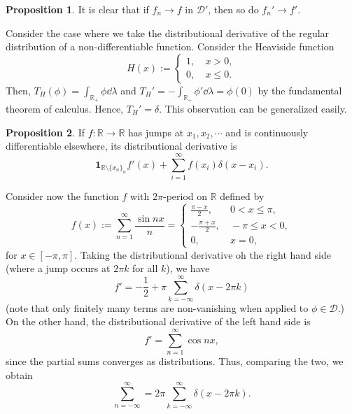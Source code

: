 \documentclass[]{article}
\theoremstyle{definition}
\theoremstyle{definition}
\newtheorem{proposition}{Proposition}[section]
\begin{document}
\begin{proposition}
  It is clear that if \(f_n \to f\) in \(\mathcal{D}'\), then so do \(f_n' \to f'\).
\end{proposition}

Consider the case where we take the distributional derivative of the regular 
distribution of a non-differentiable function. Consider the Heaviside function 
\[H(x) := \begin{cases}
  1, & \ x > 0,\\
  0, & \ x \le 0.
\end{cases}\]
Then, \(T_H(\phi) = \int_{\mathbb{R}_+} \phi \dd \lambda\) and 
\(T_H' = -  \int_{\mathbb{R}_+} \phi' \dd \lambda = \phi(0)\) by the fundamental 
theorem of calculus. Hence, \(T_H' = \delta\). This observation can be generalized 
easily. 

\begin{proposition}
  If \(f : \mathbb{R} \to \mathbb{R}\) has jumps at \(x_1, x_2, \cdots\) and 
  is continuously differentiable elsewhere, its distributional derivative is 
  \[\mathbf{1}_{\mathbb{R} \setminus \{x_n\}_n}
    f'(x) + \sum_{i = 1}^\infty f(x_i)\delta(x - x_i).\]
\end{proposition}

Consider now the function \(f\) with \(2\pi\)-period on \(\mathbb{R}\) defined by 
\[f(x) := \sum_{n = 1}^\infty \frac{\sin nx}{n} = 
  \begin{cases}
    \frac{\pi - x}{2}, & \ 0 < x \le \pi,\\
    -\frac{\pi + x}{2}, & \ -\pi \le x < 0,\\
    0, & \ x = 0,
  \end{cases}\]
for \(x \in [-\pi, \pi]\). Taking the distributional derivative oh the right hand 
side (where a jump occurs at \(2\pi k\) for all \(k\)), we have 
\[f' = - \frac{1}{2} + \pi\sum_{k = -\infty}^\infty \delta(x - 2\pi k)\]
(note that only finitely many terms are non-vanishing when applied to 
\(\phi \in \mathcal{D}\).) On the other hand, the distributional derivative 
of the left hand side is 
\[f' = \sum_{n = 1}^\infty \cos nx,\]
since the partial sums converges as distributions. Thus, comparing the 
two, we obtain 
\[\sum_{n = -\infty}^\infty = 2\pi \sum_{k = -\infty}^\infty \delta(x - 2\pi k).\]
\end{document}
